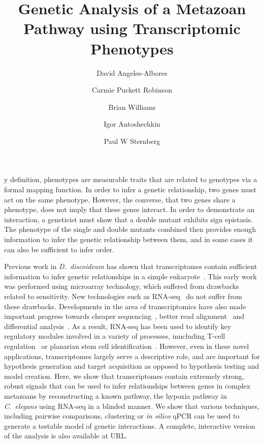 \documentclass[9pt,twocolumn,twoside]{pnas-new}
\title{Genetic Analysis of a Metazoan Pathway using Transcriptomic Phenotypes}
\author[a,b]{David Angeles-Albores}
\author[a,b]{Carmie Puckett Robinson}
\author[a]{Brian Williams}
\author[a]{Igor Antoshechkin}
\author[a,b]{Paul W Sternberg}
\affil[a]{Department of Biology and Biological Engineering, Caltech, Pasadena, USA, 91125}
\affil[b]{Howard Hughes Medical Institute}
\newcommand{\cel}{\emph{C.~elegans}}
\newcommand{\dicty}{\emph{D.~discoideum}}
\begin{document}
\verticaladjustment{-2pt}

\maketitle
\thispagestyle{firststyle}

y definition, phenotypes are measurable traits that are related to genotypes via a formal mapping function. In order to infer a genetic relationship, two genes must act on the same phenotype. However, the converse, that two genes share a phenotype, does not imply that these genes interact. In order to demonstrate an interaction, a geneticist must show that a double mutant exhibits sign epistasis. The phenotype of the single and double mutants combined then provides enough information to infer the genetic relationship between them, and in some cases it can also be sufficient to infer order.

Previous work in \dicty{} has shown that transcriptomes contain sufficient information to infer genetic relationships in a simple eukaryote~\cite{}. This early work was performed using microarray technology, which suffered from drawbacks related to sensitivity. New technologies such as RNA-seq~\cite{} do not suffer from these drawbacks. Developments in the area of transcriptomics have also made important progress towards cheaper sequencing~\cite{}, better read alignment~\cite{} and differential analysis~\cite{}.
As a result, RNA-seq has been used to identify key regulatory modules involved in a variety of processes, inncluding T-cell regulation~\cite{} or planarian stem cell identification~\cite{}. However, even in these novel applications, transcriptomes largely serve a descriptive role, and are important for hypothesis generation and target acquisition as opposed to hypothesis testing and model creation.
Here, we show that transcriptomes contain extremely strong, robust signals that can be used to infer relationships between genes in complex metazoans by reconstructing a known pathway, the hypoxia pathway in \cel{} using RNA-seq in a blinded manner. We show that various techniques, including pairwise comparisons, clustering or \emph{in silico} qPCR can be used to generate a testable model of genetic interactions. A complete, interactive version of the analysis is also available at URL.
\end{document}
